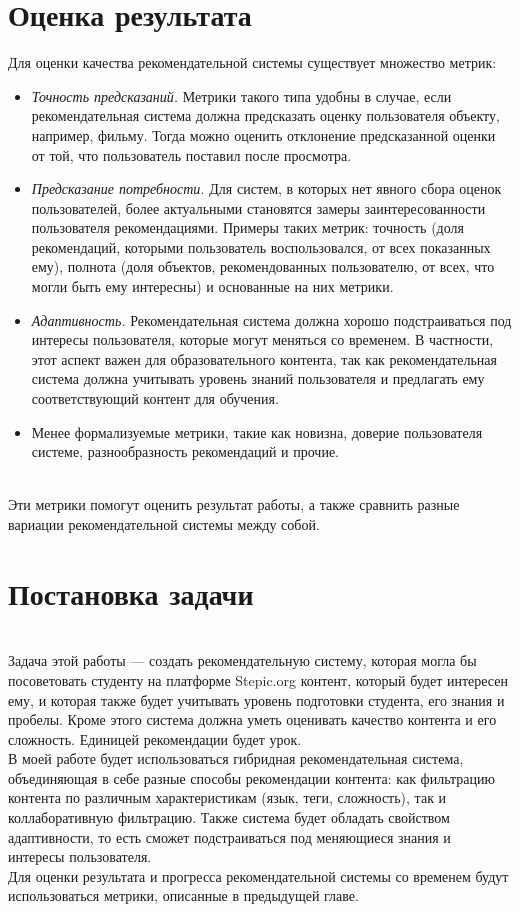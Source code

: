 \documentclass[14pt]{matmex-diploma}
\begin{document}
\section{Оценка результата}
Для оценки качества рекомендательной системы существует множество метрик\cite{rec_sys_handbook:evaluation}:
\begin{itemize}
    \item \textit{Точность предсказаний.} Метрики такого типа удобны в случае, если рекомендательная система должна предсказать оценку пользователя объекту, например, фильму. Тогда можно оценить отклонение предсказанной оценки от той, что пользователь поставил после просмотра.
    \item \textit{Предсказание потребности.} Для систем, в которых нет явного сбора оценок пользователей, более актуальными становятся замеры заинтересованности пользователя рекомендациями. Примеры таких метрик: точность (доля рекомендаций, которыми пользователь воспользовался, от всех показанных ему), полнота (доля объектов, рекомендованных пользователю, от всех, что могли быть ему интересны) и основанные на них метрики.
    \item \textit{Адаптивность.} Рекомендательная система должна хорошо подстраиваться под интересы пользователя, которые могут меняться со временем. В частности, этот аспект важен для образовательного контента, так как рекомендательная система должна учитывать уровень знаний пользователя и предлагать ему соответствующий контент для обучения.
    \item Менее формализуемые метрики, такие как новизна, доверие пользователя системе, разнообразность рекомендаций и прочие.
\end{itemize}
\\\indent Эти метрики помогут оценить результат работы, а также сравнить разные вариации рекомендательной системы между собой.


\section{Постановка задачи}
\\\indent Задача этой работы --- создать рекомендательную систему, которая могла бы посоветовать студенту на платформе Stepic.org контент, который будет интересен ему, и которая также будет учитывать уровень подготовки студента, его знания и пробелы. Кроме этого система должна уметь оценивать качество контента и его сложность. Единицей рекомендации будет урок.
\\\indent В моей работе будет использоваться гибридная рекомендательная система, объединяющая в себе разные способы рекомендации контента: как фильтрацию контента по различным характеристикам (язык, теги, сложность), так и коллаборативную фильтрацию. Также система будет обладать свойством адаптивности, то есть сможет подстраиваться под меняющиеся знания и интересы пользователя.
\\\indent Для оценки результата и прогресса рекомендательной системы со временем будут использоваться метрики, описанные в предыдущей главе.




\setmonofont[Mapping=tex-text]{CMU Typewriter Text}


\end{document}
